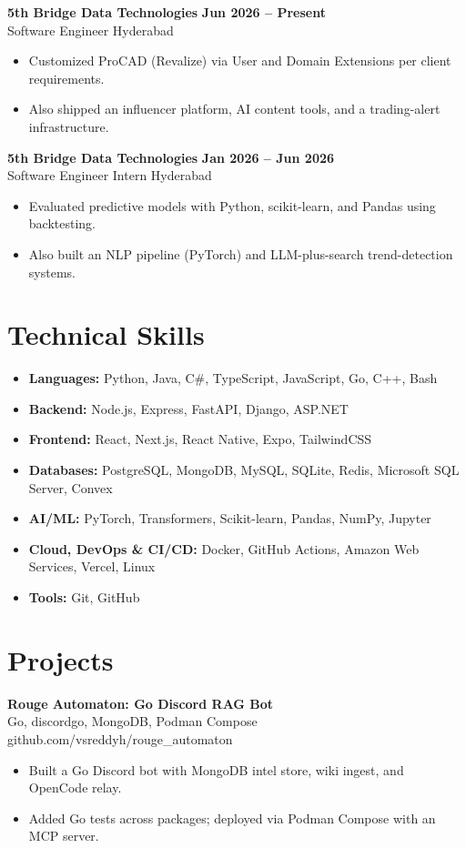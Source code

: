 \documentclass[a4paper,11pt]{article}
\newcommand{\resumeItem}[1]{\item \small{#1}}
\newcommand{\resumeSubheading}[4]{%
  \textbf{#1} \hfill \textbf{#2} \\
{#3} \hfill {#4}
}
\newcommand{\resumeSubHeadingListStart}{\begin{itemize}}
\newcommand{\resumeSubHeadingListEnd}{\end{itemize}}
\begin{document}
\resumeSubheading
{5th Bridge Data Technologies}{Jun 2026 -- Present}
{Software Engineer}{Hyderabad}
\resumeSubHeadingListStart
\resumeItem{Customized ProCAD (Revalize) via User and Domain Extensions per client requirements.}
\resumeItem{Also shipped an influencer platform, AI content tools, and a trading-alert infrastructure.}
\resumeSubHeadingListEnd

\resumeSubheading
{5th Bridge Data Technologies}{Jan 2026 -- Jun 2026}
{Software Engineer Intern}{Hyderabad}
\resumeSubHeadingListStart
\resumeItem{Evaluated predictive models with Python, scikit-learn, and Pandas using backtesting.}
\resumeItem{Also built an NLP pipeline (PyTorch) and LLM-plus-search trend-detection systems.}
\resumeSubHeadingListEnd


\section*{Technical Skills}
\begin{itemize}
\item \textbf{Languages:} Python, Java, C\#, TypeScript, JavaScript, Go, C++, Bash
\item \textbf{Backend:} Node.js, Express, FastAPI, Django, ASP.NET
\item \textbf{Frontend:} React, Next.js, React Native, Expo, TailwindCSS
\item \textbf{Databases:} PostgreSQL, MongoDB, MySQL, SQLite, Redis, Microsoft SQL Server, Convex
\item \textbf{AI/ML:} PyTorch, Transformers, Scikit-learn, Pandas, NumPy, Jupyter
\item \textbf{Cloud, DevOps \& CI/CD:} Docker, GitHub Actions, Amazon Web Services, Vercel, Linux
\item \textbf{Tools:} Git, GitHub
\end{itemize}


\section*{Projects}

\resumeSubheading
{Rouge Automaton: Go Discord RAG Bot}{}{Go, discordgo, MongoDB, Podman Compose}{github.com/vsreddyh/rouge\_automaton}
\resumeSubHeadingListStart
\resumeItem{Built a Go Discord bot with MongoDB intel store, wiki ingest, and OpenCode relay.}
\resumeItem{Added Go tests across packages; deployed via Podman Compose with an MCP server.}
\resumeSubHeadingListEnd
\end{document}
